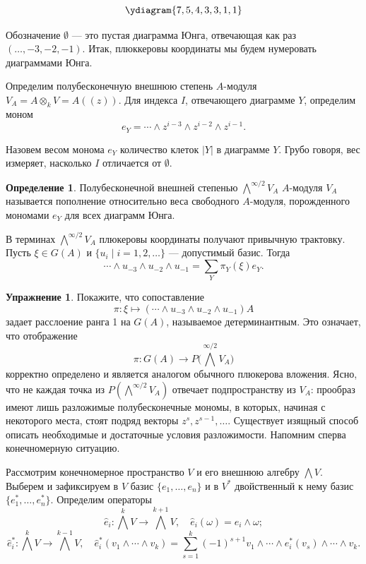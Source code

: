 \documentclass{article}
\theoremstyle{definition}
\theoremstyle{definition} %
\newtheorem{definition}{Определение}[section]
\theoremstyle{remark}     %
\theoremstyle{definition}
\theoremstyle{definition}
\theoremstyle{definition}
\theoremstyle{definition}
\theoremstyle{definition}
\theoremstyle{definition}
\theoremstyle{definition}
\theoremstyle{definition}
\newtheorem{exercise}{Упражнение}[section]
\begin{document}
\[
    \ydiagram{7, 5, 4, 3, 3, 1, 1}
\]




Обозначение \( \emptyset \) — это пустая диаграмма Юнга, отвечающая как раз \( ( \dots, -3, -2, -1 ) \). Итак, плюккеровы координаты мы будем нумеровать диаграммами Юнга.


Определим полубесконечную внешнюю степень \( A \)-модуля \( V_A = A \otimes_k V = A((z)) \). Для индекса \( I \), отвечающего диаграмме \( Y \), определим моном
\[
e_Y = \cdots \wedge z^{i-3} \wedge z^{i-2} \wedge z^{i-1}.
\]

\vspace{1em}

Назовем весом монома \( e_Y \) количество клеток \( |Y| \) в диаграмме \( Y \). Грубо говоря, вес измеряет, насколько \( I \) отличается от \( \emptyset \).

\begin{definition}
  Полубесконечной внешней степенью \( \bigwedge^{\infty/2} V_A \) \( A \)-модуля \( V_A \) называется пополнение относительно веса свободного \( A \)-модуля, порожденного мономами \( e_Y \) для всех диаграмм Юнга.
\end{definition}

В терминах \( \bigwedge^{\infty/2} V_A \) плюкеровы координаты получают привычную трактовку. Пусть \( \xi \in G(A) \) и \( \{u_i \mid i = 1, 2, \dots\} \) — допустимый базис. Тогда
\[
\cdots \wedge u_{-3} \wedge u_{-2} \wedge u_{-1} = \sum_Y \pi_Y(\xi) e_Y.
\]

\begin{exercise}
  Покажите, что сопоставление
  \[
    \pi: \xi \mapsto (\cdots \wedge u_{-3} \wedge u_{-2} \wedge u_{-1}) A
  \]
  задает расслоение ранга 1 на \( G(A) \), называемое детерминантным.  
  Это означает, что отображение
  \[
    \pi: G(A) \to P\bigl( \bigwedge^{\infty/2} V_A \bigr)
  \]
  корректно определено и является аналогом обычного плюкерова вложения.  
  Ясно, что не каждая точка из \( P(\bigwedge^{\infty/2} V_A) \) отвечает подпространству из \( V_A \):  
  прообраз имеют лишь разложимые полубесконечные мономы, в которых, начиная с некоторого места, стоят подряд векторы \( z^s, z^{s-1}, \dots \). Существует изящный способ описать необходимые и достаточные условия разложимости.  
  Напомним сперва конечномерную ситуацию.

  Рассмотрим конечномерное пространство \( V \) и его внешнюю алгебру \( \bigwedge V \).  
  Выберем и зафиксируем в \( V \) базис \( \{e_1, \dots, e_n\} \) и в \( V^* \) двойственный к нему базис \( \{e^*_1, \dots, e^*_n\} \). Определим операторы
  \[
      \hat{e}_i: \bigwedge^k V \to \bigwedge^{k+1} V, \quad \hat{e}_i(\omega) = e_i \wedge \omega;
  \]
  \[
      \hat{e}^*_i: \bigwedge^k V \to \bigwedge^{k-1} V, \quad \hat{e}^*_i(v_1 \wedge \cdots \wedge v_k) = \sum_{s=1}^k (-1)^{s+1} v_1 \wedge \cdots \wedge e^*_i(v_s) \wedge \cdots \wedge v_k.
  \]
\end{exercise}
\end{document}
